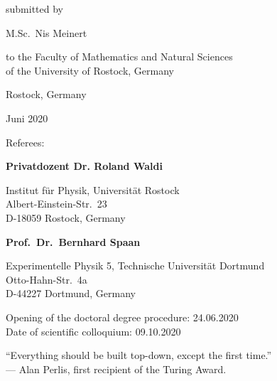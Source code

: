 \documentclass[%
a4paper,%
chapterprefix,%
numbers=noenddot,%
10pt,%
caption=tableheading]{scrbook}
\begin{document}
\begin{titlepage}
\begin{center}
        \vspace{.5cm}

        {submitted by}

        \vspace{.1cm}

        {M.Sc.\ Nis Meinert}

        \vspace{.1cm}

        {to the Faculty of Mathematics and Natural Sciences \\ of the University of Rostock, Germany}

        \vspace{3cm}

        {Rostock, Germany}

        \vspace{.1cm}
        
        {Juni 2020}
    \end{center}
\end{titlepage}
\makeatother

\newpage
\thispagestyle{empty}
\mbox{}

\clearpage
{
    \thispagestyle{empty}

    {\noindent \Large Referees:}

    \vspace{.3cm}

    \noindent \textbf{Privatdozent Dr. Roland Waldi}

    \vspace{.1cm}

    \noindent Institut für Physik, Universität Rostock \\
    Albert-Einstein-Str.\ 23 \\
    D-18059 Rostock, Germany

    \vspace{.3cm}

    \noindent \textbf{Prof.\ Dr.\ Bernhard Spaan}

    \vspace{.1cm}

    \noindent Experimentelle Physik 5, Technische Universität Dortmund \\
    Otto-Hahn-Str.\ 4a \\
    D-44227 Dortmund, Germany

    \vspace{1cm}

    \noindent Opening of the doctoral degree procedure: 24.06.2020 \\
    Date of scientific colloquium: 09.10.2020

    \vfill

    \noindent \enquote{Everything should be built top-down, except the first time.} \\
    --- Alan Perlis, first recipient of the Turing Award.
}
\end{document}
